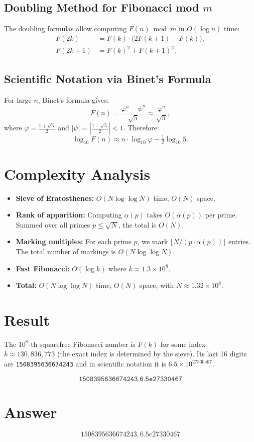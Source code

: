 \documentclass[11pt,a4paper]{article}
\begin{document}
\subsection{Doubling Method for Fibonacci mod $m$}

The doubling formulas allow computing $F(n) \bmod m$ in $O(\log n)$ time:
\begin{align}
    F(2k) &= F(k) \cdot \bigl(2F(k+1) - F(k)\bigr), \\
    F(2k+1) &= F(k)^2 + F(k+1)^2.
\end{align}

\subsection{Scientific Notation via Binet's Formula}

For large $n$, Binet's formula gives:
\[
    F(n) = \frac{\varphi^n - \psi^n}{\sqrt{5}} \approx \frac{\varphi^n}{\sqrt{5}},
\]
where $\varphi = \frac{1+\sqrt{5}}{2}$ and $|\psi| = |\frac{1-\sqrt{5}}{2}| < 1$. Therefore:
\[
    \log_{10} F(n) \approx n \cdot \log_{10}\varphi - \tfrac{1}{2} \log_{10} 5.
\]

\section{Complexity Analysis}

\begin{itemize}
    \item \textbf{Sieve of Eratosthenes:} $O(N \log \log N)$ time, $O(N)$ space.
    \item \textbf{Rank of apparition:} Computing $\alpha(p)$ takes $O(\alpha(p))$ per prime. Summed over all primes $p \leq \sqrt{N}$, the total is $O(N)$.
    \item \textbf{Marking multiples:} For each prime $p$, we mark $\lfloor N / (p \cdot \alpha(p)) \rfloor$ entries. The total number of markings is $O(N \log \log N)$.
    \item \textbf{Fast Fibonacci:} $O(\log k)$ where $k \approx 1.3 \times 10^8$.
    \item \textbf{Total:} $O(N \log \log N)$ time, $O(N)$ space, with $N \approx 1.32 \times 10^8$.
\end{itemize}

\section{Result}

The $10^8$-th squarefree Fibonacci number is $F(k)$ for some index $k \approx 130{,}836{,}773$ (the exact index is determined by the sieve). Its last 16 digits are \texttt{1508395636674243} and in scientific notation it is $6.5 \times 10^{27330467}$.

\[
\boxed{\texttt{1508395636674243,6.5e27330467}}
\]

\section{Answer}

\[
\boxed{1508395636674243,6.5e27330467}
\]
\end{document}

